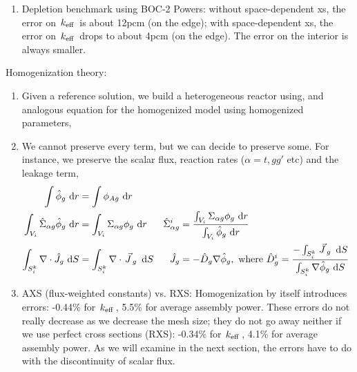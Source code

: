 \documentclass{school-22.211-notes}
\begin{document}
\begin{enumerate}
\item Depletion benchmark using BOC-2 Powers: without space-dependent xs, the error on $\left. k_{\mathrm{eff}} \right.$ is about 12pcm (on the edge); with space-dependent xs, the error on $\left. k_{\mathrm{eff}} \right.$ drops to about 4pcm (on the edge). The error on the interior is always smaller. 
\end{enumerate}

\clearpage
{}
Homogenization theory: 
\begin{enumerate}
\item Given a reference solution, we build a heterogeneous reactor using,
and analogous equation for the homogenized model using homogenized parameters,

\item We cannot preserve every term, but we can decide to preserve some. For instance, we preserve the scalar flux, reaction rates ($\alpha = t, gg'$ etc) and the leakage term, 
\begin{align}
\int \hat{\phi}_g \mbox{ }\mathrm{d} r &= \int \phi_{Ag} \mbox{ }\mathrm{d} r  \\
\int_{V_i} \hat{\Sigma}_{\alpha g} \hat{\phi}_g \mbox{ }\mathrm{d} r &= \int_{V_i} \Sigma_{\alpha g} \phi_g \mbox{ }\mathrm{d} r  & \hat{\Sigma}_{\alpha g}^i &= \frac{\int_{V_i} \Sigma_{\alpha g} \phi_g \mbox{ }\mathrm{d} r}{\int_{V_i} \hat{\phi}_g \mbox{ }\mathrm{d} r} \\
\int_{S_i^k} \nabla \cdot \hat{J}_g \mbox{ }\mathrm{d} S &= \int_{S_i^k} \nabla \cdot \left.\vec{J}\right._g \mbox{ }\mathrm{d} S & \hat{J}_g &= - \hat{D}_g \nabla \hat{\phi}_g, \mbox{ where } \hat{D}_g^i = \frac{-\int_{S_i^k} \left.\vec{J}\right._g \mbox{ }\mathrm{d} S}{\int_{S_i^k} \nabla \hat{\phi}_g \mbox{ }\mathrm{d} S}
\end{align}

\item AXS (flux-weighted constants) vs. RXS: Homogenization by itself introduces errors: -0.44\% for $\left. k_{\mathrm{eff}} \right.$, 5.5\% for average assembly power. These errors do not really decrease as we decrease the mesh size; they do not go away neither if we use perfect cross sections (RXS): -0.34\% for $\left. k_{\mathrm{eff}} \right.$, 4.1\% for average assembly power. As we will examine in the next section, the errors have to do with the discontinuity of scalar flux. 


\end{enumerate}
\end{document}
